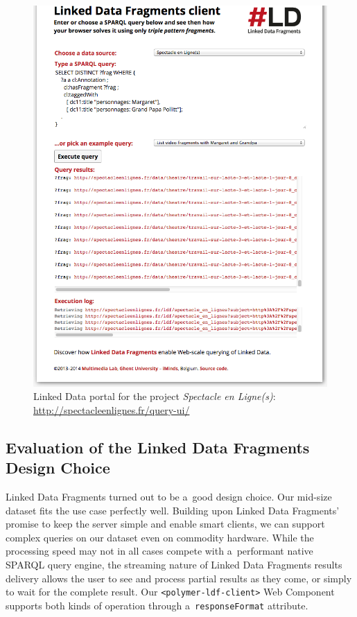 \documentclass[runningheads,a4paper]{llncs}
\begin{document}
\begin{figure}[hbt]
  \centering
  \includegraphics[width=1\textwidth]{linkeddatafragments.png}
  \caption{Linked Data portal for the project \emph{Spectacle en Ligne(s)}: \url{http://spectacleenlignes.fr/query-ui/}}
  \label{fig:ldf}
\end{figure}

\vspace{-2em}
\subsection{Evaluation of the Linked Data Fragments Design Choice}

Linked Data Fragments turned out to be a~good design choice.
Our mid-size dataset fits the use case perfectly well.
Building upon Linked Data Fragments' promise to keep the server simple
and enable smart clients, we can support complex queries on our dataset
even on commodity hardware.
While the processing speed may not in all cases compete with a~performant
native SPARQL query engine, the streaming nature of Linked Data Fragments
results delivery allows the user to see and process partial results as they come,
or simply to wait for the complete result.
Our \texttt{<polymer-ldf-client>} Web Component supports both kinds of operation
through a~\texttt{responseFormat} attribute.
\end{document}
